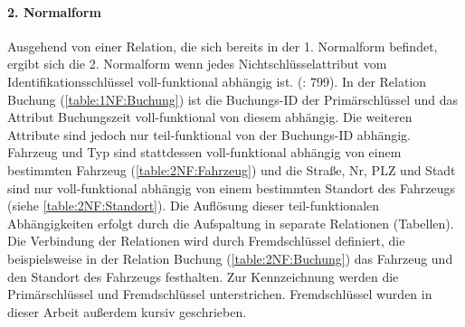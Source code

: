 \paragraph{2. Normalform}
Ausgehend von einer Relation, die sich bereits in der 1. Normalform befindet, ergibt sich die 2. Normalform wenn jedes Nichtschlüsselattribut vom Identifikationsschlüssel voll-funktional abhängig ist. (\cite{gehringWirtschaftsinformatik2022}: 799). In der Relation Buchung (\autoref{table:1NF:Buchung}) ist die Buchungs-ID der Primärschlüssel und das Attribut Buchungszeit voll-funktional von diesem abhängig. Die weiteren Attribute sind jedoch nur teil-funktional von der Buchungs-ID abhängig. Fahrzeug und Typ sind stattdessen voll-funktional abhängig von einem bestimmten Fahrzeug (\autoref{table:2NF:Fahrzeug}) und die Stra\ss e, Nr, PLZ und Stadt sind nur voll-funktional abhängig von einem bestimmten Standort des Fahrzeugs (siehe \autoref{table:2NF:Standort}). Die Auflösung dieser teil-funktionalen Abhängigkeiten erfolgt durch die Aufspaltung in separate Relationen (Tabellen). Die Verbindung der Relationen wird durch Fremdschlüssel definiert, die beispielsweise in der Relation Buchung (\autoref{table:2NF:Buchung}) das Fahrzeug und den Standort des Fahrzeugs festhalten. Zur Kennzeichnung werden die Primärschlüssel und Fremdschlüssel unterstrichen. Fremdschlüssel wurden in dieser Arbeit außerdem kursiv geschrieben.

